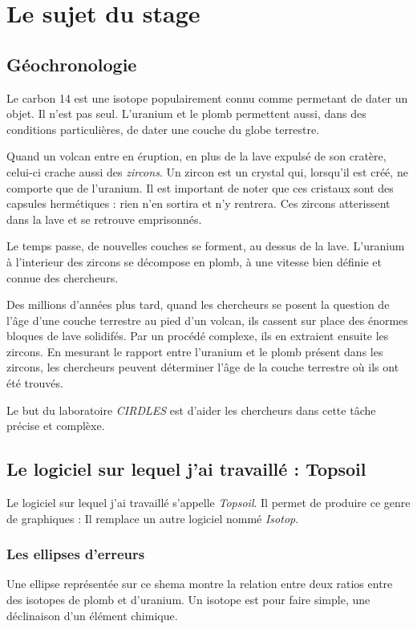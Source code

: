 \chapter{Le sujet du stage}
\section{Géochronologie} %
Le carbon 14 est une isotope populairement connu comme permetant de dater un objet. Il n'est pas seul. L'uranium et le plomb permettent aussi, dans des conditions particulières, de dater une couche du globe terrestre.

Quand un volcan entre en éruption, en plus de la lave expulsé de son cratère, celui-ci crache aussi des \textit{zircons}. Un zircon est un crystal qui, lorsqu'il est créé, ne comporte que de l'uranium. Il est important de noter que ces cristaux sont des capsules hermétiques : rien n'en sortira et n'y rentrera. Ces zircons atterissent dans la lave et se retrouve emprisonnés. 

Le temps passe, de nouvelles couches se forment, au dessus de la lave. L'uranium à l'interieur des zircons se décompose en plomb, à une vitesse bien définie et connue des chercheurs. 

Des millions d'années plus tard, quand les chercheurs se posent la question de l'âge d'une couche terrestre au pied d'un volcan, ils cassent sur place des énormes bloques de lave solidifés. Par un procédé complexe, ils en extraient ensuite les zircons. En mesurant le rapport entre l'uranium et le plomb présent dans les zircons, les chercheurs peuvent déterminer l'âge de la couche terrestre où ils ont été trouvés.

Le but du laboratoire \textit{CIRDLES} est d'aider les chercheurs dans cette tâche précise et complèxe.

\section{Le logiciel sur lequel j'ai travaillé : Topsoil}
Le logiciel sur lequel j'ai travaillé s'appelle \textit{Topsoil}. Il permet de produire ce genre de graphiques :
Il remplace un autre logiciel nommé \textit{Isotop}.

\subsection{Les ellipses d'erreurs}
Une ellipse représentée sur ce shema montre la relation entre deux ratios entre des isotopes de plomb et d'uranium. Un isotope est pour faire simple, une déclinaison d'un élément chimique.\\

